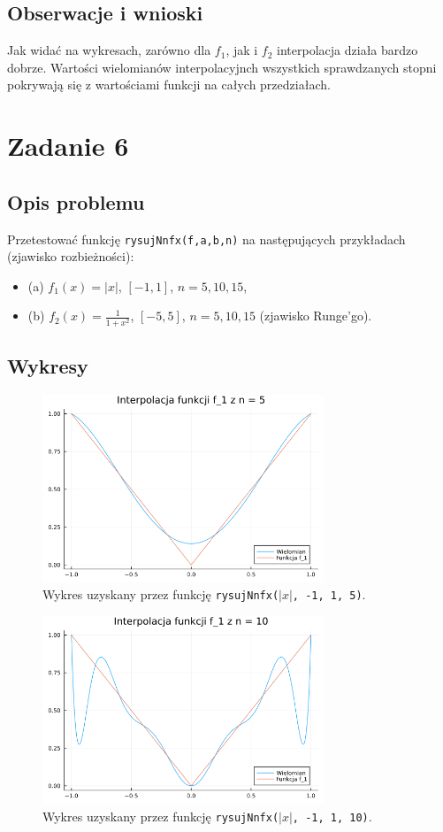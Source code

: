 \documentclass{article}
\begin{document}
\subsection{Obserwacje i wnioski}
Jak widać na wykresach, zarówno dla $f_1$, jak i $f_2$ interpolacja działa bardzo dobrze.
Wartości wielomianów interpolacyjnch wszystkich sprawdzanych stopni pokrywają się z wartościami funkcji na całych przedziałach.


\section{Zadanie 6}
\subsection{Opis problemu}
Przetestować funkcję \texttt{rysujNnfx(f,a,b,n)} na następujących przykładach (zjawisko rozbieżności):
\begin{itemize}
    \item (a) $f_1(x) = |x|$, $[-1, 1]$, $n = 5, 10, 15$,
    \item (b) $f_2(x) = \frac{1}{1+x^2}$, $[-5, 5]$, $n = 5, 10, 15$ (zjawisko Runge'go).
\end{itemize}

\subsection{Wykresy}
\begin{figure}[H]
\centering
\includegraphics[width=0.75\textwidth]{task6_f1_n5.png}
\caption{Wykres uzyskany przez funkcję \texttt{rysujNnfx($|x|$, -1, 1, 5)}.}
\end{figure}

\begin{figure}[H]
\centering
\includegraphics[width=0.75\textwidth]{task6_f1_n10.png}
\caption{Wykres uzyskany przez funkcję \texttt{rysujNnfx($|x|$, -1, 1, 10)}.}
\end{figure}
\end{document}
